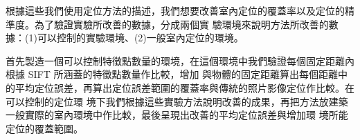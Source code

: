 

	
	根據這些我們使用定位方法的描述，我們想要改善室內定位的覆蓋率以及定位的精準度。為了驗證實驗所改善的數據，分成兩個實
驗環境來說明方法所改善的數據：(1)可以控制的實驗環境、(2)一般室內定位的環境。

	首先製造一個可以控制特徵點數量的環境，在這個環境中我們驗證每個固定距離內根據 SIFT 所涵蓋的特徵點數量作比較，增加
與物體的固定距離算出每個距離中的平均定位誤差，再算出定位誤差範圍的覆蓋率與傳統的照片影像定位作比較。在可以控制的定位環
境下我們根據這些實驗方法說明改善的成果，再把方法放建築一般實際的室內環境中作比較，最後呈現出改善的平均定位誤差與增加環
境所能定位的覆蓋範圍。




